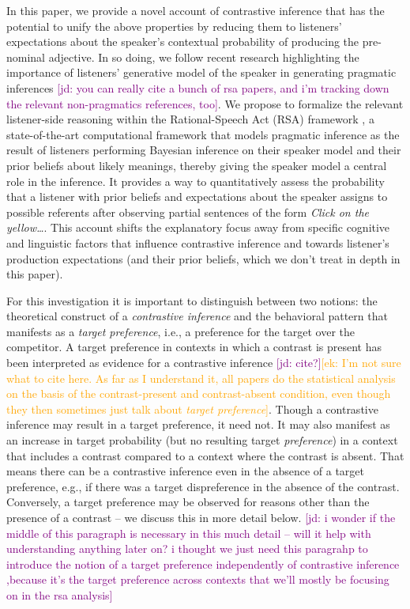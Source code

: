 \documentclass[10pt,letterpaper]{article}
\newcommand{\ek}[1]{\textcolor{Orange}{[ek: #1]}}
\newcommand{\jd}[1]{\textcolor{Purple}{[jd: #1]}}
\begin{document}
In this paper, we provide a novel account of contrastive inference that has the potential to unify the above properties by reducing them to listeners' expectations about the speaker's contextual probability of producing the pre-nominal adjective. In so doing, we follow recent research highlighting the importance of listeners' generative model of the speaker in generating pragmatic inferences \cite{Hawkins:2018,Kao:2015,Kleinschmidt:2011,Rubio-Fernandez:2018}\jd{you can really cite a bunch of rsa papers, and i'm tracking down the relevant non-pragmatics references, too}. We propose to formalize the relevant listener-side reasoning within the Rational-Speech Act (RSA) framework \cite{Frank:2012, Goodman:2016}, a state-of-the-art computational framework that models pragmatic inference as the result of listeners performing Bayesian inference on their speaker model and their prior beliefs about likely meanings, thereby giving the speaker model a central role in the inference. It provides a way to quantitatively assess the probability that a listener with prior beliefs and expectations about the speaker assigns to possible referents after observing partial sentences of the form \emph{Click on the yellow\dots}. This account shifts the explanatory focus away from specific cognitive and linguistic factors that influence contrastive inference and towards listener's production expectations (and their prior beliefs, which we don't treat in depth in this paper).

For this investigation it is important to distinguish between two notions: the theoretical construct of a \emph{contrastive inference} and the behavioral pattern that manifests as a \emph{target preference}, i.e., a preference for the target over the competitor. A target preference in contexts in which a contrast is present has been interpreted as evidence for a contrastive inference \jd{cite?}\ek{I'm not sure what to cite here. As far as I understand it, all papers do the statistical analysis on the basis of the contrast-present and contrast-absent condition, even though they then sometimes just talk about \textit{target preference}}. Though a contrastive inference may result in a target preference, it need not. It may also manifest as an increase in target probability (but no resulting target \emph{preference}) in a context that includes a contrast compared to a context where the contrast is absent. That means there can be a contrastive inference even in the absence of a target preference, e.g., if there was a target dispreference in the absence of the contrast. Conversely, a target preference may be observed for reasons other than the presence of a contrast -- we discuss this in more detail below. \jd{i wonder if the middle of this paragraph is necessary in this much detail -- will it help with understanding anything later on? i thought we just need this paragrahp to introduce the notion of a target preference independently of contrastive inference ,because it's the target preference across contexts that we'll mostly be focusing on in the rsa analysis}
\end{document}
